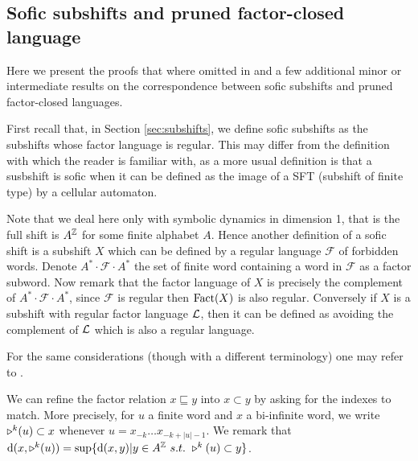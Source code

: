 
\subsection{Sofic subshifts and pruned factor-closed language}
\label{app:bijection-subshifts}
Here we present the proofs that where omitted in  and a few additional minor or intermediate results on the correspondence between sofic subshifts and pruned factor-closed languages.

First recall that, in Section \ref{sec:subshifts}, we define sofic subshifts as the subshifts whose factor language is regular.
This may differ from the definition with which the reader is familiar with, as a more usual definition is that a susbshift is sofic when it can be defined as the image of a SFT (subshift of finite type) by a cellular automaton.

Note that we deal here only with symbolic dynamics in dimension 1, that is the full shift is $A^{\mathbb{Z}}$ for some finite alphabet $A$.
Hence another definition of a sofic shift is a subshift $X$ which can be defined by a regular language $\mathcal{F}$ of forbidden words. Denote $A^*\cdot \mathcal{F}\cdot A^*$ the set of finite word containing a word in $\mathcal{F}$ as a factor subword.
Now remark that the factor language of $X$ is precisely the complement of $A^*\cdot \mathcal{F} \cdot A^*$, since $\mathcal{F}$ is regular then $\mathrm{Fact}(X)$ is also regular.
Conversely if $X$ is a subshift with regular factor language ${\mathcal{L}}$, then it can be defined as avoiding the complement of ${\mathcal{L}}$ which is also a regular language.

For the same considerations (though with a different terminology) one may refer to \cite{lind-marcus}.

We can refine the factor relation $x \sqsubseteq y$ into $x \subset y$ by asking for the indexes to match. More precisely, for $u$ a finite word and $x$ a bi-infinite word, we write $\shift{k}{}(u)\subset x$ whenever $u=x_{-k}\dots x_{-k+|u|-1}$. We remark that $\mathrm{d}(x,\shift{k}{}(u))= \sup\{ \mathrm{d}(x,y) | y\in A^\ZZ\ s.t.\ \shift{k}{}(u)\subset y\}$.

